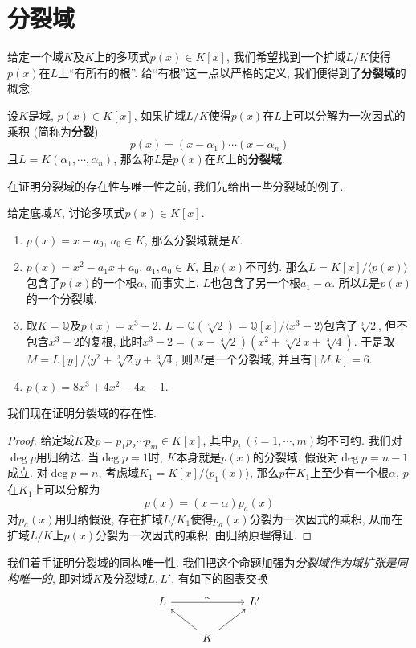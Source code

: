 \section{分裂域}
给定一个域$K$及$K$上的多项式$p(x)\in K[x]$, 我们希望找到一个扩域$L/K$使得$p(x)$在$L$上``有所有的根''.
给``有根''这一点以严格的定义, 我们便得到了\textbf{分裂域}的概念:
\begin{defn}
    设$K$是域, $p(x)\in K[x]$, 如果扩域$L/K$使得$p(x)$在$L$上可以分解为一次因式的乘积 (简称为\textbf{分裂})
    \[p(x)=(x-\alpha_1)\cdots(x-\alpha_n)\]
    且$L=K(\alpha_1,\cdots,\alpha_n)$, 那么称$L$是$p(x)$在$K$上的\textbf{分裂域}.
\end{defn}

在证明分裂域的存在性与唯一性之前, 我们先给出一些分裂域的例子.
\begin{eg}给定底域$K$, 讨论多项式$p(x)\in K[x]$.
    \begin{enumerate}
        \item $p(x)=x-a_0$, $a_0\in K$, 那么分裂域就是$K$.
        \item $p(x)=x^2-a_1x+a_0$, $a_1,a_0\in K$, 且$p(x)$不可约.
        那么$L=K[x]/\langle p(x)\rangle$包含了$p(x)$的一个根$\alpha$, 而事实上, $L$也包含了另一个根$a_1-\alpha$.
        所以$L$是$p(x)$的一个分裂域.
        \item 取$K=\mathbb{Q}$及$p(x)=x^3-2$. $L=\mathbb{Q}(\sqrt[3]{2})=\mathbb{Q}[x]/\langle x^3-2\rangle$包含了$\sqrt[3]{2}$, 但不包含$x^3-2$的复根, 此时$x^3-2=(x-\sqrt[3]{2})(x^2+\sqrt[3]{2}x+\sqrt[3]{4})$.
        于是取$M=L[y]/\langle y^2+\sqrt[3]{2}y+\sqrt[3]{4}$, 则$M$是一个分裂域, 并且有$[M:k]=6$.
        \item $p(x)=8x^3+4x^2-4x-1$.
    \end{enumerate}
\end{eg}

我们现在证明分裂域的存在性.
\begin{proof}
    给定域$K$及$p=p_1p_2\cdots p_m\in K[x]$, 其中$p_i\ (i=1,\cdots,m)$均不可约.
    我们对$\deg{p}$用归纳法.
    当$\deg{p}=1$时, $K$本身就是$p(x)$的分裂域.
    假设对$\deg{p}=n-1$成立.
    对$\deg{p}=n$, 考虑域$K_1=K[x]/\langle p_1(x)\rangle$, 那么$p$在$K_1$上至少有一个根$\alpha$, $p$在$K_1$上可以分解为
    \[p(x)=(x-\alpha)p_a(x)\]
    对$p_a(x)$用归纳假设, 存在扩域$L/K_1$使得$p_a(x)$分裂为一次因式的乘积, 从而在扩域$L/K$上$p(x)$分裂为一次因式的乘积.
    由归纳原理得证.
\end{proof}

我们着手证明分裂域的同构唯一性.
我们把这个命题加强为\textit{分裂域作为域扩张是同构唯一的}, 即对域$K$及分裂域$L,L'$, 有如下的图表交换
\[\begin{tikzcd}
    L\ar[rr, "\sim"] & & L'\\
    & K \ar[ul] \ar[ur] &
\end{tikzcd}\]

